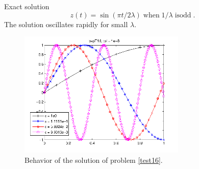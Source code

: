 \documentclass[<options>]{article}
\begin{document}
\textrm{Exact solution}
$$z(t) =  \sin( \pi t / 2\lambda) \operatorname{when} 1/\lambda \operatorname{is odd}.$$
The solution oscillates rapidly for small $\lambda.$

\begin{figure}[htb]
\centerline{\includegraphics[height=6cm]{Prob16}}
\caption{Behavior of the solution of problem \ref{test16}.}
\end{figure}
\newpage
\end{document}
